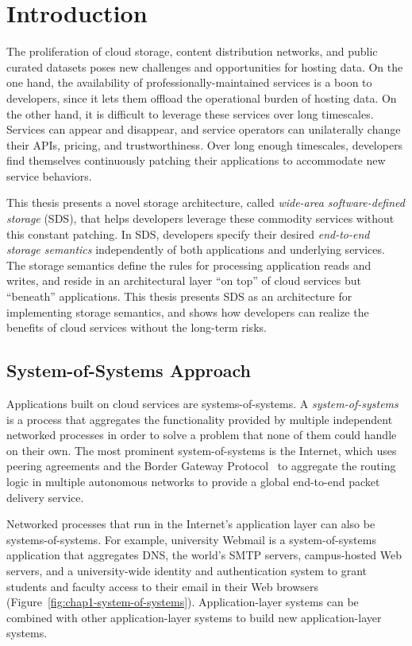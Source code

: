 \chapter{Introduction}
\label{chap:introduction}

The proliferation of cloud storage, content distribution networks, and 
public curated datasets poses new challenges and
opportunities for hosting data.  On the one hand, the availability of
professionally-maintained services is a boon to developers, since it lets them
offload the operational burden of hosting data.  On the other
hand, it is difficult to leverage these services over long
timescales.  Services can appear and disappear, and service operators can
unilaterally change their APIs, pricing, and trustworthiness.
Over long enough timescales, developers find themselves continuously
patching their applications to accommodate new service behaviors.

This thesis presents a novel storage architecture, called \emph{wide-area
software-defined storage} (SDS), that helps developers
leverage these commodity services without this constant patching.
In SDS, developers specify their desired
\emph{end-to-end storage semantics} independently of
both applications and underlying services.  The storage semantics define the
rules for processing application reads and writes, and reside in an architectural
layer ``on top'' of cloud services but ``beneath'' applications.
This thesis presents SDS as an architecture for implementing storage semantics, and
shows how developers can realize the benefits of cloud services without the
long-term risks.

\section{System-of-Systems Approach}

Applications built on cloud services are systems-of-systems.
A \emph{system-of-systems} is a process that aggregates the
functionality provided by multiple independent networked processes
in order to solve a problem that none of them could
handle on their own.  The most prominent system-of-systems 
is the Internet, which uses peering agreements and the Border Gateway
Protocol~\cite{bgp} to aggregate the routing logic in
multiple autonomous networks to provide a global end-to-end packet delivery
service.

Networked processes that run in the Internet's application layer can also
be systems-of-systems.  For example, university Webmail is a
system-of-systems application that 
aggregates DNS, the world's SMTP servers, campus-hosted
Web servers, and a university-wide identity and authentication
system to grant students and faculty access to their email in their Web browsers
(Figure~\ref{fig:chap1-system-of-systems}).  Application-layer systems can be combined with other
application-layer systems to build new application-layer systems.


